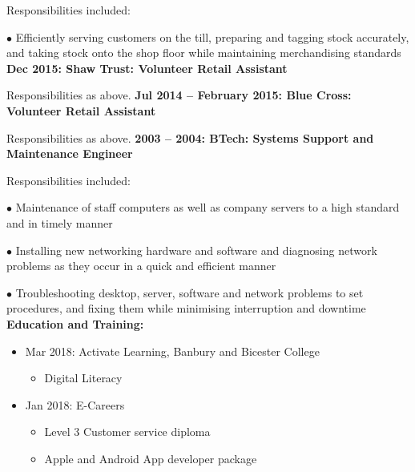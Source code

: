 \documentclass[10pt,a4paper]{book}
\begin{document}
\begin{flushleft}
Responsibilities included:

  \item[$\bullet$]Efficiently serving customers on the till, preparing and tagging stock accurately, and taking stock onto the shop floor while maintaining merchandising standards
    \linebreak{}
    \linebreak{}
  \textbf {Dec 2015: Shaw Trust: Volunteer Retail Assistant}

Responsibilities as above.
\linebreak{}
\linebreak{}
  \textbf {Jul 2014 -- February 2015: Blue Cross: Volunteer Retail Assistant}

Responsibilities as above.
\linebreak{}
\linebreak{}
\textbf {2003 -- 2004: BTech: Systems Support and Maintenance Engineer}
  
Responsibilities included:

  \item[$\bullet$]Maintenance of staff computers as well as company servers to a high standard and in timely manner

  \item[$\bullet$]Installing new networking hardware and software and diagnosing network problems as they occur in a quick and efficient manner

  \item[$\bullet$]Troubleshooting desktop, server, software and network problems to set procedures, and fixing them while minimising interruption and downtime
    \linebreak{}
\linebreak{}
\textbf {Education and Training:}
\begin{itemize}
  \item Mar 2018: Activate Learning, Banbury and Bicester College
    \begin{itemize}
    \item Digital Literacy
  \end{itemize}
\end{itemize}
\begin{itemize}
  \item Jan 2018: E-Careers
    \begin{itemize}
    \item Level 3 Customer service diploma

    \item Apple and Android App developer package


\end{itemize}
\end{itemize}
\end{flushleft}
\end{document}
